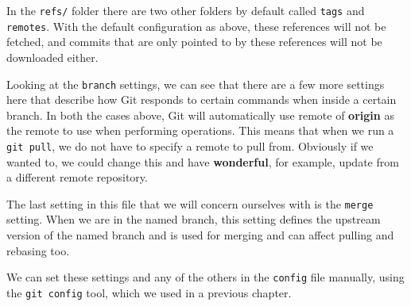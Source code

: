 In the \texttt{refs/} folder there are two other folders by default called \texttt{tags} and \texttt{remotes}.
With the default configuration as above, these references will not be fetched,
and commits that are only pointed to by these references will not be downloaded either.

Looking at the \texttt{branch} settings, we can see that there are a few more settings here that describe how Git responds to certain commands when inside a certain branch.
In both the cases above, Git will automatically use remote of \textbf{origin} as the remote to use when performing operations.
This means that when we run a \texttt{git pull}, we do not have to specify a remote to pull from.
Obviously if we wanted to, we could change this and have \textbf{wonderful}, for example, update from a different remote repository.

The last setting in this file that we will concern ourselves with is the \texttt{merge} setting.  
When we are in the named branch, this setting defines the upstream version of the named branch and is used for merging and can affect pulling and rebasing too.

We can set these settings and any of the others in the \texttt{config} file manually,
using the \texttt{git config} tool, which we used in a previous chapter.
